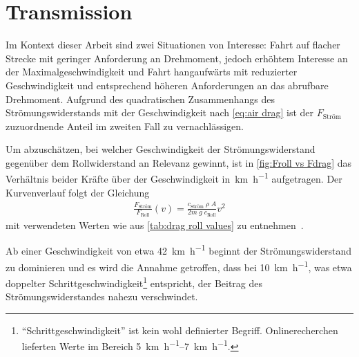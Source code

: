 	\section{Transmission}\label{sec:transmission}
		Im Kontext dieser Arbeit sind zwei Situationen von Interesse: Fahrt auf flacher Strecke mit geringer Anforderung an Drehmoment, jedoch erhöhtem Interesse an der Maximalgeschwindigkeit und Fahrt hangaufwärts mit reduzierter Geschwindigkeit und entsprechend höheren Anforderungen an das abrufbare Drehmoment.
		Aufgrund des quadratischen Zusammenhangs des Strömungswiderstands mit der Geschwindigkeit nach \cref{eq:air drag} ist der \(F_\text{Ström}\) zuzuordnende Anteil im zweiten Fall zu vernachlässigen.

		Um abzuschätzen, bei welcher Geschwindigkeit der Strömungswiderstand gegenüber dem Rollwiderstand an Relevanz gewinnt, ist in \cref{fig:Froll vs Fdrag} das Verhältnis beider Kräfte über der Geschwindigkeit in~\unit{\kilo\metre\per\hour} aufgetragen.
		Der Kurvenverlauf folgt der Gleichung
		\begin{align}
			\frac{F_\text{Ström}}{F_\text{Roll}}(v) = \frac{c_\text{Ström} \; \rho \; A}{2m \; g \; c_\text{Roll}} v^2
			\label{eq:F_drag F_roll ratio over speed}
		\end{align}
		mit verwendeten Werten wie aus \cref{tab:drag roll values} zu entnehmen~\cites{GESTIS.Luft}{air.drag.human.body.VANINGENSCHENAU1982}{material.advances.skateboarding.WATERMAN1978}.

		Ab einer Geschwindigkeit von etwa \qty{42}{\kilo\metre\per\hour} beginnt der Strömungswiderstand zu dominieren und es wird die Annahme getroffen, dass bei \qty{10}{\kilo\metre\per\hour}, was etwa doppelter Schrittgeschwindigkeit\footnote{\hspace{1mm} ``Schrittgeschwindigkeit'' ist kein wohl definierter Begriff. Onlinerecherchen lieferten Werte im Bereich \qtyrange{5}{7}{\kilo\metre\per\hour}.} entspricht, der Beitrag des Strömungswiderstandes nahezu verschwindet.

